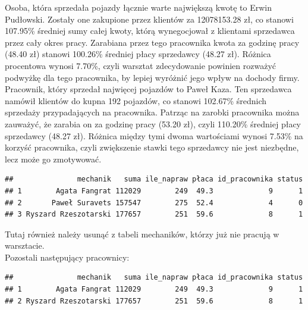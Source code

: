 \documentclass{article}\usepackage[]{graphicx}\usepackage[]{xcolor}
\makeatletter
\newenvironment{kframe}{%
 \def\at@end@of@kframe{}%
 \ifinner\ifhmode%
  \def\at@end@of@kframe{\end{minipage}}%
  \begin{minipage}{\columnwidth}%
 \fi\fi%
 \def\FrameCommand##1{\hskip\@totalleftmargin \hskip-\fboxsep
 \colorbox{shadecolor}{##1}\hskip-\fboxsep
     \hskip-\linewidth \hskip-\@totalleftmargin \hskip\columnwidth}%
 \MakeFramed {\advance\hsize-\width
   \@totalleftmargin\z@ \linewidth\hsize
   \@setminipage}}%
 {\par\unskip\endMakeFramed%
 \at@end@of@kframe}
\newenvironment{knitrout}{}{} %
\makeatother
\begin{document}
Osoba, która sprzedała pojazdy łącznie warte największą kwotę to Erwin Pudłowski. Zostały one zakupione przez klientów za 12078153.28 zł, co stanowi 107.95\% średniej sumy całej kwoty, którą wynegocjował z klientami sprzedawca przez cały okres pracy. Zarabiana przez tego pracownika kwota za godzinę pracy (48.40 zł) stanowi 100.26\% średniej płacy sprzedawcy (48.27 zł). Różnica procentowa wynosi 7.70\%, czyli warsztat zdecydowanie powinien rozważyć podwyżkę dla tego pracownika, by lepiej wyróżnić jego wpływ na dochody firmy. \\

Pracownik, który sprzedał najwięcej pojazdów to Paweł Kaza. Ten sprzedawca namówił klientów do kupna 192 pojazdów, co stanowi 102.67\% średnich sprzedaży przypadających na pracownika. Patrząc na zarobki pracownika można zauważyć, że zarabia on za godzinę pracy (53.20 zł), czyli 110.20\% średniej płacy sprzedawcy (48.27 zł). Różnica między tymi dwoma wartościami wynosi 7.53\% na korzyść pracownika, czyli zwiększenie stawki tego sprzedawcy nie jest niezbędne, lecz może go zmotywować. 

\begin{knitrout}
\color{fgcolor}\begin{kframe}
\begin{verbatim}
##               mechanik   suma ile_napraw płaca id_pracownika status
## 1        Agata Fangrat 112029        249  49.3             9      1
## 2       Paweł Suravets 157547        275  52.4             4      0
## 3 Ryszard Rzeszotarski 177657        251  59.6             8      1
\end{verbatim}
\end{kframe}
\end{knitrout}


Tutaj również należy usunąć z tabeli mechaników, którzy już nie pracują w warsztacie. \\

Pozostali następujący pracownicy:

\begin{knitrout}
\color{fgcolor}\begin{kframe}
\begin{verbatim}
##               mechanik   suma ile_napraw płaca id_pracownika status
## 1        Agata Fangrat 112029        249  49.3             9      1
## 2 Ryszard Rzeszotarski 177657        251  59.6             8      1
\end{verbatim}
\end{kframe}
\end{knitrout}
\end{document}
